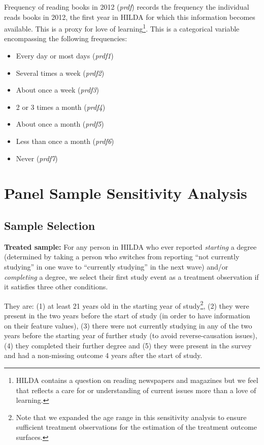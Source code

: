 \documentclass[12pt, a4paper]{article}
\begin{document}
Frequency of reading books in 2012 (\textit{p\textunderscore{}rdf}) records the frequency the individual reads books in 2012, the first year in HILDA for which this information becomes available. This is a proxy for love of learning\footnote{HILDA contains a question on reading newspapers and magazines but we feel that reflects a care for or understanding of current issues more than a love of learning.}. This is a categorical variable encompassing the following frequencies:
\begin{itemize}
  \item Every day or most days (\textit{p\textunderscore{}rdf1}) 
  \item Several times a week (\textit{p\textunderscore{}rdf2}) 
  \item About once a week (\textit{p\textunderscore{}rdf3}) 
  \item 2 or 3 times a month (\textit{p\textunderscore{}rdf4}) 
  \item About once a month (\textit{p\textunderscore{}rdf5}) 
  \item Less than once a month (\textit{p\textunderscore{}rdf6}) 
  \item Never (\textit{p\textunderscore{}rdf7}) 
\end{itemize}

\clearpage

\section{Panel Sample Sensitivity Analysis}
\label{app:sensitivity}

\subsection{Sample Selection}

\textbf{Treated sample:} For any person in HILDA who ever reported \textit{starting} a degree (determined by taking a person who switches from reporting “not currently studying” in one wave to “currently studying” in the next wave) and/or \textit{completing} a degree, we select their first study event as a treatment observation if it satisfies three other conditions.

They are: (1) at least 21 years old in the starting year of study\footnote{Note that we expanded the age range in this sensitivity analysis to ensure sufficient treatment observations for the estimation of the treatment outcome surfaces.}, (2) they were present in the two years before the start of study (in order to have information on their feature values), (3) there were not currently studying in any of the two years before the starting year of further study (to avoid reverse-causation issues), (4) they completed their further degree and (5) they were present in the survey and had a non-missing outcome 4 years after the start of study. 
\end{document}
